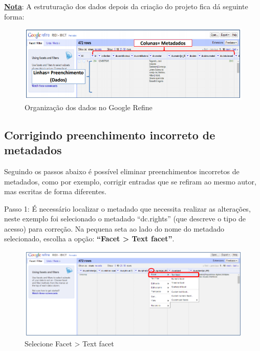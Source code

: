 \documentclass[12pt,hidelinks]{article}
\begin{document}
\newpage
    
    \underline{\textbf{Nota}}: A estruturação dos dados depois da criação do projeto fica dá seguinte forma:
    
    \begin{figure}[!htp]
                \centering
                \includegraphics[scale=0.7]{figura/Figura189.png}
                \caption{Organização dos dados no Google Refine}
            \label{Rotulo}
        \end{figure}
        
    \subsection{Corrigindo preenchimento incorreto de metadados}
    
    Seguindo os passos abaixo é possível eliminar preenchimentos incorretos de metadados, como por exemplo, corrigir entradas que se refiram ao mesmo autor, mas escritas de forma diferentes.
    
    \singlespacing
    
    Passo 1: É necessário localizar o metadado que necessita realizar as alterações, neste exemplo foi selecionado o metadado “dc.rights” (que descreve o tipo de acesso) para correção. Na pequena seta ao lado do nome do metadado selecionado, escolha a opção: \textbf{“Facet > Text facet”}.
    
    \begin{figure}[!htp]
                \centering
                \includegraphics[scale=0.7]{figura/Figura190.png}
                \caption{Selecione Facet > Text facet}
            \label{Rotulo}
        \end{figure}
        
\end{document}
